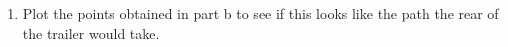 \documentclass{article}
\begin{document}
\begin{embeddedproblem}{}
\begin{enumerate}[label={\bf{}(\alph*)}]
                  \item  Plot the points obtained in part b to see if this looks like
                    the path the rear of the trailer would take.
                  \end{enumerate}
                \end{embeddedproblem}
  
\end{document}
